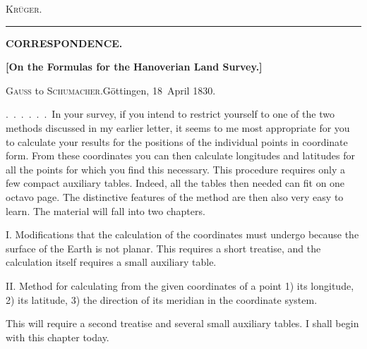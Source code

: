 \begin{flushright}\textsc{Krüger.}\end{flushright}
\begin{center}\rule{7cm}{.5pt}\end{center}
\par\endgroup
\clearpage
\vspace*{1.3cm}
\begin{center}
{\Large\bfseries CORRESPONDENCE.}\par
\vspace{1.7cm}
{\large\bfseries [On the Formulas for the Hanoverian Land Survey.]}\par
\bigskip
\textsc{Gauss} to \textsc{Schumacher}.\quad Göttingen, 18~April 1830.
\end{center}
\medskip
.\ .\ .\ .\ .\ .\ In your survey, if you intend to restrict yourself to one of the two methods discussed in my earlier letter, it seems to me most appropriate for you to calculate your results for the positions of the individual points in coordinate form. From these coordinates you can then calculate longitudes and latitudes for all the points for which you find this necessary. This procedure requires only a few compact auxiliary tables. Indeed, all the tables then needed can fit on one octavo page. The distinctive features of the method are then also very easy to learn. The material will fall into two chapters.

I. Modifications that the calculation of the coordinates must undergo because the surface of the Earth is not planar. This requires a short treatise, and the calculation itself requires a small auxiliary table.

II. Method for calculating from the given coordinates of a point 1) its longitude, 2) its latitude, 3) the direction of its meridian in the coordinate system.

This will require a second treatise and several small auxiliary tables. I shall begin with this chapter today.

